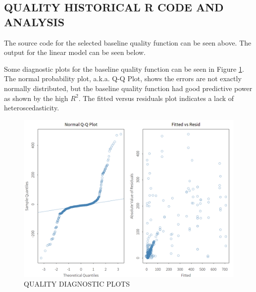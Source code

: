 \documentclass[SDSUThesis.tex]{subfiles}
\begin{document}
    \subsection{QUALITY HISTORICAL R CODE AND ANALYSIS}
    \label{app:quality-history}
        
        The source code for the selected baseline quality function
        can be seen above. The output for the linear model can be seen below.
        
        
        Some diagnostic plots for the baseline quality function
        can be seen in Figure \ref{fig:quality-diag}.  The normal probability plot,
        a.k.a. Q-Q Plot, shows the errors are not exactly normally distributed, but
        the baseline quality function had good predictive power as shown by the
        high $R^2$. The fitted versus
        residuals plot indicates a lack of heteroscedasticity.  
        \begin{figure}[ht]
            \centering
            \includegraphics[scale=.25]{images/quality_diag.png}
            \caption{QUALITY DIAGNOSTIC PLOTS}
            \label{fig:quality-diag}
        \end{figure}
        
\end{document}
